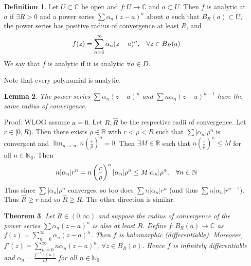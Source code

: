 \documentclass[11pt]{article}
\theoremstyle{plain}
\newtheorem{theorem}{Theorem}[section]
\newtheorem{lemma}[theorem]{Lemma}
\theoremstyle{definition}
\newtheorem{definition}[theorem]{Definition}
\begin{document}
\begin{definition}
Let $U \subset \mathbb{C}$ be open and $f: U \to \mathbb{C}$ and $a \subset U$. Then $f$ is analytic at $a$ if $\exists R > 0$ and a power series $\sum \alpha_n(z-a)^n$ about $a$ such that $B_R(a) \subset U$, the power series has positive radius of convergence at least $R$, and 
$$ f(z) = \sum_{n = 0}^{\infty} \alpha_n(z - a)^n, \hspace{3mm} \forall z \in B_R(a) $$
We say that $f$ is analytic if it is analytic $\forall a \in D$.
\end{definition}

Note that every polynomial is analytic.

\begin{lemma}
The power series $\sum \alpha_n (z -a)^n$ and $\sum n\alpha_n(z - a)^{n-1}$ have the same radius of convergence.
\end{lemma}

Proof: WLOG assume $a = 0$. Let $R, \hat{R}$ be the respective radii of convergence. Let $r \in [0, R)$. Then there exists $\rho \in \mathbb{R}$ with $r < \rho < R$ such that $\sum |\alpha_n|\rho^n$ is convergent and $\lim_{n \to \infty} n \left(\frac{r}{\rho}\right)^n = 0$. Then $\exists M \in \mathbb{R}$ such that $n \left(\frac{r}{\rho}\right)^n \leq M$ for all $n \in \mathbb{N}_0$. Then 
$$ n|\alpha_n|r^n = n \left(\frac{r}{\rho}\right)^n|\alpha_n| \rho^n \leq M |\alpha_n| \rho^n, \hspace{3mm} \forall n \in \mathbb{N}$$
Thus since $\sum |\alpha_n| \rho^n$ converges, so too does $\sum n|\alpha_n|r^n$ (and thus $\sum n|\alpha_n|r^{n-1}$). Thus $\hat{R} \geq r$ and so $\hat{R} \geq R$. The other direction is similar.

\begin{theorem}
Let $R \in (0, \infty)$ and suppose the radius of convergence of the power series $\sum \alpha_n(z-a)^n$ is also at least $R$. Define $f:B_R(a) \to \mathbb{C}$ as $f(z) = \sum_{n=0}^{\infty} \alpha_n(z - a)^n$. Then $f$ is holomorphic (differentiable). Moreover, $f'(z) = \sum_{n = 0}^{\infty} n\alpha_n (z - a)^n$, $\forall z \in B_R(a)$. Hence $f$ is infinitely differentiable and $\alpha_n = \frac{f^{(n)}(a)}{n!}$ for all $n \in \mathbb{N}_0$.
\end{theorem}
\end{document}
